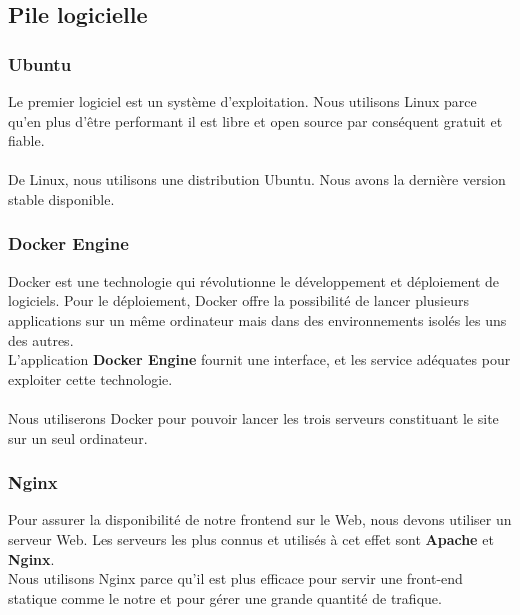 \subsection{Pile logicielle}
\subsubsection{Ubuntu}
Le premier logiciel est un syst\`eme d'exploitation. Nous utilisons Linux parce qu'en plus d'\^etre performant il est libre et open source par cons\'equent gratuit et fiable.

\paragraph{}De Linux, nous utilisons une distribution Ubuntu. Nous avons la derni\`ere version stable disponible.

\subsubsection{Docker Engine}
Docker est une technologie qui r\'evolutionne le d\'eveloppement et d\'eploiement de logiciels. Pour le d\'eploiement, Docker offre la possibilit\'e de lancer plusieurs applications sur un m\^eme ordinateur mais dans des environnements isol\'es les uns des autres.\\

L'application \textbf{Docker Engine} fournit une interface, et les service ad\'equates pour exploiter cette technologie.

\paragraph{} Nous utiliserons Docker pour pouvoir lancer les trois serveurs constituant le site sur un seul ordinateur.

\subsubsection{Nginx}
Pour assurer la disponibilit\'e de notre frontend sur le Web, nous devons utiliser un serveur Web. Les serveurs les plus connus et utilis\'es \`a cet effet sont \textbf{Apache} et \textbf{Nginx}.\\
Nous utilisons Nginx parce qu'il est plus efficace pour servir une front-end statique comme le notre et pour g\'erer une grande quantit\'e de trafique.







